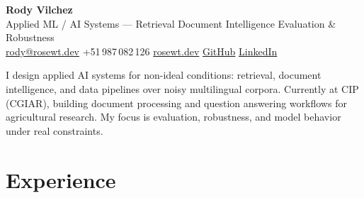 \documentclass[a4paper,10pt]{article}
\begin{document}
\begin{center}
  \textbf{\LARGE Rody Vilchez}\\[4pt]
  Applied ML / AI Systems --- Retrieval \textperiodcentered{} Document Intelligence \textperiodcentered{} Evaluation \& Robustness\\[3pt]
  \small
  \href{mailto:rody@rosewt.dev}{rody@rosewt.dev} \enspace\textbar\enspace
  +51\,987\,082\,126 \enspace\textbar\enspace
  \href{https://rosewt.dev}{rosewt.dev} \enspace\textbar\enspace
  \href{https://github.com/R0SEWT}{GitHub} \enspace\textbar\enspace
  \href{https://www.linkedin.com/in/r0sewt/}{LinkedIn}
\end{center}

\vspace{2pt}

\small
I design applied AI systems for non-ideal conditions: retrieval, document intelligence, and data pipelines over noisy multilingual corpora. Currently at CIP (CGIAR), building document processing and question answering workflows for agricultural research. My focus is evaluation, robustness, and model behavior under real constraints.

\vspace{2pt}

\section*{Experience}
\end{document}
